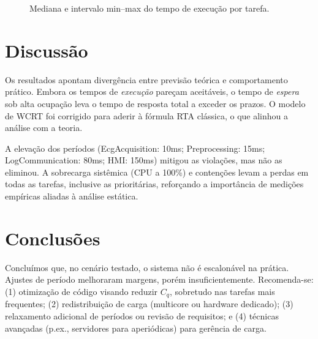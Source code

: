 \documentclass[conference]{IEEEtran}
\begin{document}
\begin{figure}[H]
\centering
{}
\caption{Mediana e intervalo min--max do tempo de execução por tarefa.}
\label{fig:exec_dist_alt}
\end{figure}

\section{Discussão}
Os resultados apontam divergência entre previsão teórica e comportamento prático. Embora os tempos de \emph{execução} pareçam aceitáveis, o tempo de \emph{espera} sob alta ocupação leva o tempo de resposta total a exceder os prazos. O modelo de WCRT foi corrigido para aderir à fórmula RTA clássica, o que alinhou a análise com a teoria.

A elevação dos períodos (EcgAcquisition: 10ms; Preprocessing: 15ms; LogCommunication: 80ms; HMI: 150ms) mitigou as violações, mas não as eliminou. A sobrecarga sistêmica (CPU a 100\%) e contenções levam a perdas em todas as tarefas, inclusive as prioritárias, reforçando a importância de medições empíricas aliadas à análise estática.

\section{Conclusões}
Concluímos que, no cenário testado, o sistema não é escalonável na prática. Ajustes de período melhoraram margens, porém insuficientemente. Recomenda-se: (1) otimização de código visando reduzir $C_q$, sobretudo nas tarefas mais frequentes; (2) redistribuição de carga (multicore ou hardware dedicado); (3) relaxamento adicional de períodos ou revisão de requisitos; e (4) técnicas avançadas (p.ex., servidores para aperiódicas) para gerência de carga.
\end{document}
